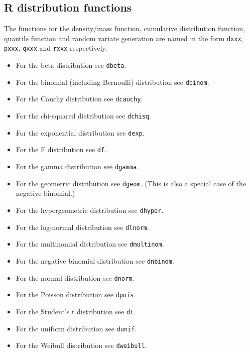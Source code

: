 \subsection{R distribution functions}
The functions for the density/mass function, cumulative distribution function, quantile function and random variate generation are named in the form \lstinline{dxxx}, \lstinline{pxxx}, \lstinline{qxxx} and \lstinline{rxxx} respectively.
\begin{itemize}
\item For the beta distribution see \lstinline{dbeta}.
\item For the binomial (including Bernoulli) distribution see \lstinline{dbinom}.
\item For the Cauchy distribution see \lstinline{dcauchy}.
\item For the chi-squared distribution see \lstinline{dchisq}.
\item For the exponential distribution see \lstinline{dexp}.
\item For the F distribution see \lstinline{df}.
\item For the gamma distribution see \lstinline{dgamma}.
\item For the geometric distribution see \lstinline{dgeom}. (This is also a special case of the negative binomial.)
\item For the hypergeometric distribution see \lstinline{dhyper}.
\item For the log-normal distribution see \lstinline{dlnorm}.
\item For the multinomial distribution see \lstinline{dmultinom}.
\item For the negative binomial distribution see \lstinline{dnbinom}.
\item For the normal distribution see \lstinline{dnorm}.
\item For the Poisson distribution see \lstinline{dpois}.
\item For the Student's t distribution see \lstinline{dt}.
\item For the uniform distribution see \lstinline{dunif}.
\item For the Weibull distribution see \lstinline{dweibull}.
\end{itemize}

